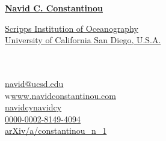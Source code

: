 \documentclass[10pt, letter]{article}
\def\www{http://www.navidconstantinou.com}
\begin{document}
\reversemarginpar
{\huge{ \href{http://www.navidconstantinou.com}{\color{jhublue}\bf Navid C. Constantinou}}}\\[.42cm]
\parbox{.57\linewidth}{
\href{https://scripps.ucsd.edu}{\color{black}Scripps Institution of Oceanography}\\
\href{http://www.ucsd.edu}{\color{black}University of California San Diego, U.S.A.}\\
\mbox{}\\
\mbox{}\\
}
\parbox{.43\linewidth}{
{}\hspace{.26cm}\href{mailto:navid@ucsd.edu}{navid@ucsd.edu}\\
\textsc{w}\hspace{.24cm}\href{\www}{www.navidconstantinou.com}\\
\faGithub\hspace{.24cm}\href{https://github.com/navidcy}{navidcy}\hspace{3.9em}\faVimeo\hspace{.24cm}\href{https://vimeo.com/navidcy}{navidcy}\\
{}\hspace{.24cm}\href{http://orcid.org/0000-0002-8149-4094}{0000-0002-8149-4094}\\
{}\hspace{.24cm}\href{https://arxiv.org/a/constantinou_n_1.html}{arXiv/a/constantinou\_n\_1}}






%
%
%
\end{document}
